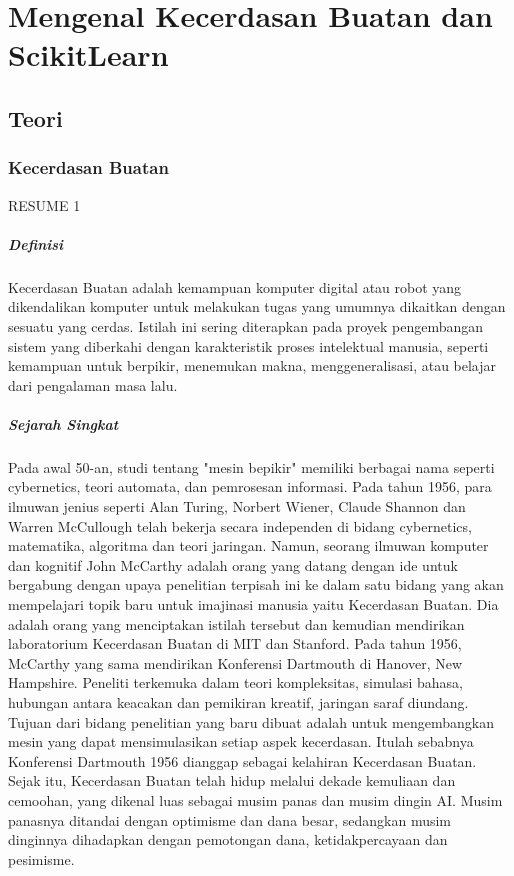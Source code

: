\chapter{Mengenal Kecerdasan Buatan dan ScikitLearn}

\section{Teori}

\subsection{Kecerdasan Buatan}
RESUME 1

\paragraph{Definisi}\hspace{0pt} \par
Kecerdasan Buatan adalah kemampuan komputer digital atau robot yang dikendalikan komputer untuk melakukan tugas yang umumnya dikaitkan dengan sesuatu yang cerdas. Istilah ini sering diterapkan pada proyek pengembangan sistem yang diberkahi dengan karakteristik proses intelektual manusia, seperti kemampuan untuk berpikir, menemukan makna, menggeneralisasi, atau belajar dari pengalaman masa lalu.

\paragraph{Sejarah Singkat}\hspace{0pt}\par
Pada awal 50-an, studi tentang "mesin bepikir" memiliki berbagai nama seperti cybernetics, teori automata, dan pemrosesan informasi. Pada tahun 1956, para ilmuwan jenius seperti Alan Turing, Norbert Wiener, Claude Shannon dan Warren McCullough telah bekerja secara independen di bidang cybernetics, matematika, algoritma dan teori jaringan.
Namun, seorang ilmuwan komputer dan kognitif John McCarthy adalah orang yang datang dengan ide untuk bergabung dengan upaya penelitian terpisah ini ke dalam satu bidang yang akan mempelajari topik baru untuk imajinasi manusia yaitu Kecerdasan Buatan. Dia adalah orang yang menciptakan istilah tersebut dan kemudian mendirikan laboratorium Kecerdasan Buatan di MIT dan Stanford.
Pada tahun 1956, McCarthy yang sama mendirikan Konferensi Dartmouth di Hanover, New Hampshire. Peneliti terkemuka dalam teori kompleksitas, simulasi bahasa, hubungan antara keacakan dan pemikiran kreatif, jaringan saraf diundang. Tujuan dari bidang penelitian yang baru dibuat adalah untuk mengembangkan mesin yang dapat mensimulasikan setiap aspek kecerdasan. Itulah sebabnya Konferensi Dartmouth 1956 dianggap sebagai kelahiran Kecerdasan Buatan.
Sejak itu, Kecerdasan Buatan telah hidup melalui dekade kemuliaan dan cemoohan, yang dikenal luas sebagai musim panas dan musim dingin AI. Musim panasnya ditandai dengan optimisme dan dana besar, sedangkan musim dinginnya dihadapkan dengan pemotongan dana, ketidakpercayaan dan pesimisme.

